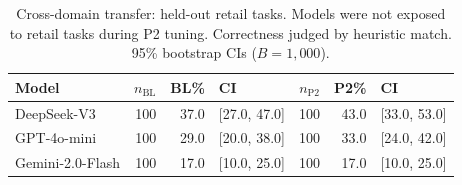 \begin{table}[t]
\centering
\caption{Cross-domain transfer: held-out retail tasks. Models were not exposed to retail tasks during P2 tuning. Correctness judged by heuristic match. 95\% bootstrap CIs ($B = 1{,}000$).}
\label{tab:retail}
\begin{tabular}{l r r l r r l}
\toprule
Model & $n_{\mathrm{BL}}$ & BL\% & CI & $n_{\mathrm{P2}}$ & P2\% & CI \\
\midrule
DeepSeek-V3 & 100 & 37.0 & [27.0, 47.0] & 100 & 43.0 & [33.0, 53.0] \\
GPT-4o-mini & 100 & 29.0 & [20.0, 38.0] & 100 & 33.0 & [24.0, 42.0] \\
Gemini-2.0-Flash & 100 & 17.0 & [10.0, 25.0] & 100 & 17.0 & [10.0, 25.0] \\
\bottomrule
\end{tabular}
\end{table}